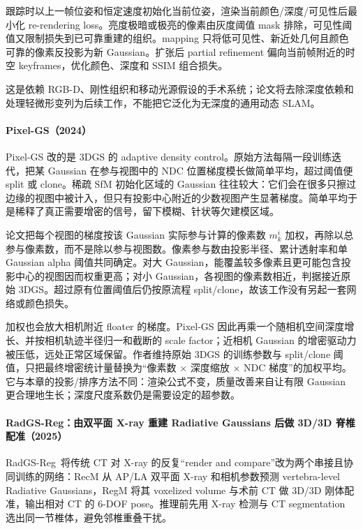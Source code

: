 跟踪时以上一帧位姿和恒定速度初始化当前位姿，渲染当前颜色/深度/可见性后最小化 re-rendering loss。亮度极暗或极亮的像素由灰度阈值 mask 排除，可见性阈值又限制损失到已可靠重建的组织。mapping 只将低可见性、新近处几何且颜色可靠的像素反投影为新 Gaussian。扩张后 partial refinement 偏向当前帧附近的时空 keyframes，优化颜色、深度和 SSIM 组合损失。

这是依赖 RGB-D、刚性组织和移动光源假设的手术系统；论文将去除深度依赖和处理轻微形变列为后续工作，不能把它泛化为无深度的通用动态 SLAM。


\paragraph{Pixel-GS（2024）\cite{2403_15530}}
Pixel-GS 改的是 3DGS 的 adaptive density control。原始方法每隔一段训练迭代，把某 Gaussian 在参与视图中的 NDC 位置梯度模长做简单平均，超过阈值便 split 或 clone。稀疏 SfM 初始化区域的 Gaussian 往往较大：它们会在很多只擦过边缘的视图中被计入，但只有投影中心附近的少数视图产生显著梯度。简单平均于是稀释了真正需要增密的信号，留下模糊、针状等欠建模区域。

论文把每个视图的梯度按该 Gaussian 实际参与计算的像素数 $m_k^i$ 加权，再除以总参与像素数，而不是除以参与视图数。像素参与数由投影半径、累计透射率和单 Gaussian alpha 阈值共同确定。对大 Gaussian，能覆盖较多像素且更可能包含投影中心的视图因而权重更高；对小 Gaussian，各视图的像素数相近，判据接近原始 3DGS。超过原有位置阈值后仍按原流程 split/clone，故该工作没有另起一套网络或颜色损失。

加权也会放大相机附近 floater 的梯度。Pixel-GS 因此再乘一个随相机空间深度增长、并按相机轨迹半径归一和截断的 scale factor；近相机 Gaussian 的增密驱动力被压低，远处正常区域保留。作者维持原始 3DGS 的训练参数与 split/clone 阈值，只把最终增密统计量替换为“像素数 $\times$ 深度缩放 $\times$ NDC 梯度”的加权平均。它与本章的投影/排序方法不同：渲染公式不变，质量改善来自让有限 Gaussian 更合理地生长；深度尺度系数仍是需要设定的超参数。

\paragraph{RadGS-Reg：由双平面 X-ray 重建 Radiative Gaussians 后做 3D/3D 脊椎配准（2025）\cite{2508_21154}}
RadGS-Reg~\cite{2508_21154}将传统 CT 对 X-ray 的反复“render and compare”改为两个串接且协同训练的网络：RecM 从 AP/LA 双平面 X-ray 和相机参数预测 vertebra-level Radiative Gaussians，RegM 将其 voxelized volume 与术前 CT 做 3D/3D 刚体配准，输出相对 CT 的 6-DOF pose。推理前先用 X-ray 检测与 CT segmentation 选出同一节椎体，避免邻椎重叠干扰。

